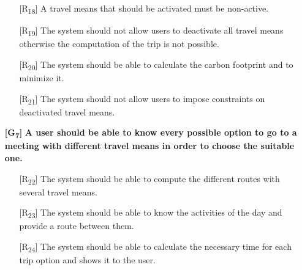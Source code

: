 \documentclass[12pt,titlepage]{article}
\begin{document}
\begin{itemize}
\begin{itemize}
\item[{[R\textsubscript{18}]}] A travel means that should be activated must be non-active.
\item[{[R\textsubscript{19}]}]  The system should not allow users to deactivate all travel means otherwise the computation of the trip is not possible.
\item[{[R\textsubscript{20}]}]  The system should be able to calculate the carbon footprint and to minimize it.
\item[{[R\textsubscript{21}]}]  The system should not allow users to impose constraints on deactivated travel means.
\end{itemize}

\item[\textbf{ {[G\textsubscript{7}]}}]	\textbf{	A user should be able to know every possible option to go to a meeting with different travel means in order to choose the suitable one.}
\begin{itemize}
\item[{[R\textsubscript{22}]}]  The system should be able to compute the different routes with several travel means.
\item[{[R\textsubscript{23}]}] The system should be able to know the activities of the day and provide a route between them.
\item[{[R\textsubscript{24}]}] The system should be able to calculate the necessary time for each trip option and shows it to the user.
\end{itemize}


\end{itemize}
\end{document}
